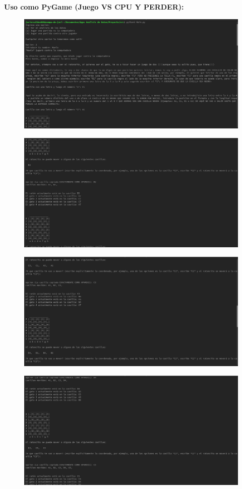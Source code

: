 \documentclass[12pt, Tahoma]{article}
\begin{document}
	
	\textbf{Uso como PyGame (Juego VS CPU Y PERDER): }
	\begin{figure}[H]
		\centering
		\includegraphics[scale=0.3]{Resultados3.png}
	\end{figure}
	\begin{figure}[H]
		\centering
		\includegraphics[scale=0.3]{Resultados4.png}
	\end{figure}
	\begin{figure}[H]
		\centering
		\includegraphics[scale=0.3]{Resultados5.png}
	\end{figure}
	\begin{figure}[H]
		\centering
		\includegraphics[scale=0.3]{Resultados6.png}
	\end{figure}
\end{document}
